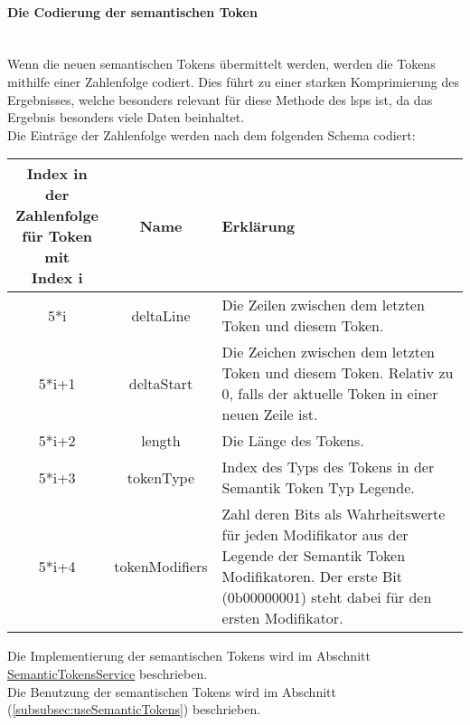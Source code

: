 \documentclass[./einleitung.tex]{subfiles}
\begin{document}
    \paragraph{Die Codierung der semantischen Token}\label{par:semantic-code}\mbox{}\\
    Wenn die neuen semantischen Tokens übermittelt werden, werden die Tokens mithilfe einer Zahlenfolge codiert.
    Dies führt zu einer starken Komprimierung des Ergebnisses, welche besonders relevant für diese Methode des \acrshort{lsp}s ist, da das Ergebnis besonders viele Daten beinhaltet.\\
    Die Einträge der Zahlenfolge werden nach dem folgenden Schema codiert:
    \begin{center}
        \begin{tabular}{| c | c | m{21.5em} |}
            \hline
            \makecell{Index in der\\ Zahlenfolge\\für Token mit \\Index i} & Name & Erklärung \\
            \hline
            5*i & deltaLine & Die Zeilen zwischen dem letzten Token und diesem Token. \\
            \hline
            5*i+1 & deltaStart & Die Zeichen zwischen dem letzten Token und diesem Token.
            Relativ zu 0, falls der aktuelle Token in einer neuen Zeile ist. \\
            \hline
            5*i+2 & length & Die Länge des Tokens. \\
            \hline
            5*i+3 & tokenType & Index des Typs des Tokens in der Semantik Token Typ Legende. \\
            \hline
            5*i+4 & tokenModifiers & Zahl deren Bits als Wahrheitswerte für jeden Modifikator aus der Legende der Semantik Token Modifikatoren.
            Der erste Bit (0b00000001) steht dabei für den ersten Modifikator. \\
            \hline
        \end{tabular}
    \end{center}
    Die Implementierung der semantischen Tokens wird im Abschnitt \hyperref[subsubsec:semantic-service]{SemanticTokensService} beschrieben.\\
    Die Benutzung der semantischen Tokens wird im Abschnitt  (\ref{subsubsec:useSemanticTokens}) beschrieben.
\end{document}
